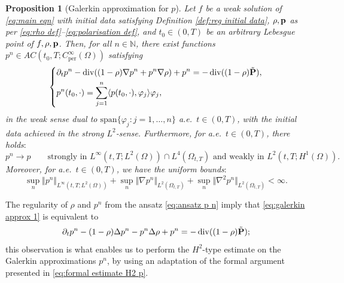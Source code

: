 \documentclass[11pt,a4paper,reqno]{amsart}
\newtheorem{prop}{Proposition}[section]
\theoremstyle{remark}
\theoremstyle{definition}
\numberwithin{equation}{section}
\newcommand{\per}{\mathrm{per}}
\DeclareMathOperator{\dv}{div}
\renewcommand{\P}{{\bf P}}
\newcommand{\p}{{\bf p}}
\begin{document}
\begin{prop}[Galerkin approximation for $p$]\label{prop:galerkin}
Let $f$ be a weak solution of \eqref{eq:main eqn} with initial data satisfying Definition \ref{def:reg initial data}, $\rho,\p$ as per \eqref{eq:rho def}--\eqref{eq:polarisation def}, and $t_0 \in (0,T)$ be an arbitrary Lebesgue point of $f,\rho,\p$. Then, for all $n\in\mathbb{N}$, there exist functions $ p^n \in AC(t_0,T;C^\infty_\per(\Omega))$ satisfying 
    \begin{equation}\label{eq:galerkin approx 1}
    \left\lbrace \begin{aligned} 
        &\partial_t p^n - \dv((1-\rho)\nabla p^n + p^n \nabla \rho) + p^n = - \dv((1-\rho)\tilde{\P}), \\ 
        &p^n(t_0,\cdot) = \sum_{j=1}^n \langle p(t_0,\cdot),\varphi_j \rangle \varphi_j, 
    \end{aligned}\right. 
\end{equation}
in the weak sense dual to $\mathrm{span}\{\varphi_j:j=1,\dots,n\}$ a.e.~$t \in (0,T)$, with the initial data achieved in the strong $L^2$-sense. Furthermore, for a.e.~$t\in(0,T)$, there holds$:$ 
    \begin{equation}\label{eq:strong conv galerkin p}
    p^n \to p \qquad \text{strongly in } L^\infty(t,T;L^2(\Omega)) \cap L^4(\Omega_{t,T}) \text{ and weakly in } L^2(t,T;H^1(\Omega)). 
\end{equation}
Moreover, for a.e.~$t\in(0,T)$, we have the uniform bounds$:$ 
\begin{equation}\label{eq:unif bounds for galerkin}
    \sup_n \Vert p^n \Vert_{L^\infty(t,T;L^2(\Omega))} + \sup_n \Vert \nabla p^n \Vert_{L^2(\Omega_{t,T})} + \sup_n \Vert \nabla^2 p^n \Vert_{L^2(\Omega_{t,T})} < \infty. 
\end{equation}
\end{prop}

The regularity of $\rho$ and $p^n$ from the ansatz \eqref{eq:ansatz p n} imply that \eqref{eq:galerkin approx 1} is equivalent to 
\begin{equation}\label{eq:galerkin approx 2}
     \partial_t p^n - (1-\rho)\Delta p^n - p^n \Delta \rho + p^n = - \dv((1-\rho)\tilde{\P}); 
\end{equation}
this observation is what enables us to perform the $H^2$-type estimate on the Galerkin approximations $p^n$, by using an adaptation of the formal argument presented in \eqref{eq:formal estimate H2 p}. 
\end{document}
